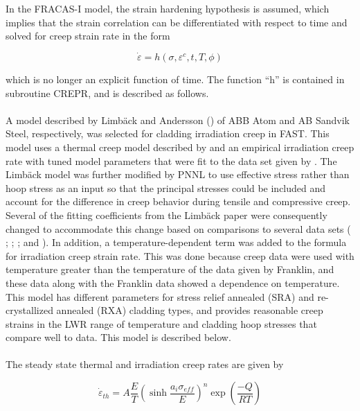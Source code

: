In the FRACAS-I model, the strain hardening hypothesis is assumed, which implies that the strain
correlation can be differentiated with respect to time and solved for creep strain rate in the form

\begin{equation}
    \label{eq:creep_strain_rate}
    \dot{\varepsilon} = h\left(\sigma, \varepsilon^{c}, t, T, \phi\right)
\end{equation}

which is no longer an explicit function of time. The function ``h'' is contained in subroutine
CREPR, and is described as follows.
\\
\\ 
A model described by Limb\"{a}ck and Andersson (\cite{ref:Limback1996a}) of ABB Atom and AB
Sandvik Steel, respectively, was selected for cladding irradiation creep in FAST.  This model uses a
thermal creep model described by \cite{ref:Matsuo1987b} and an empirical irradiation creep rate with
tuned model parameters that were fit to the data set given by \cite{ref:Franklin1983}. The
Limb\"{a}ck model was further modified by PNNL to use effective stress rather than hoop stress as an
input so that the principal stresses could be included and account for the difference in creep
behavior during tensile and compressive creep.  Several of the fitting coefficients from the
Limb\"{a}ck paper were consequently changed to accommodate this change based on comparisons to
several data sets ( \cite{ref:Franklin1983}; \cite{ref:Soniak2002b}; \cite{ref:Gilbon2000a}; and
\cite{ref:Sontheimer1994}).  In addition, a temperature-dependent term was added to the formula for
irradiation creep strain rate. This was done because creep data were used with temperature greater
than the temperature of the data given by Franklin, and these data along with the Franklin data
showed a dependence on temperature. This model has different parameters for stress relief annealed
(SRA) and re-crystallized annealed (RXA) cladding types, and provides reasonable creep strains in
the LWR range of temperature and cladding hoop stresses that compare well to data. This model is
described below.
\\
\\
The steady state thermal and irradiation creep rates are given by

\begin{equation}
    \dot{\varepsilon}_{th} = A \frac{E}{T} \left( \sinh \frac{a_{i}\sigma_{eff}}{E}\right)^{n} \exp\left(\frac{-Q}{RT}\right)
    \label{eq:steady_state_thermal_creep_rate}
\end{equation}

